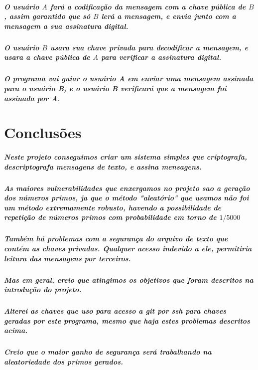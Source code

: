 \documentclass[12pt,twoside, a4paper, twocolumn]{article}
\begin{document}
\subparagraph*{O usuário $A$ fará a codificação da mensagem com a chave pública de $B$, assim garantido que só $B$ lerá a mensagem, e envia junto com a mensagem a sua assinatura digital.}

\subparagraph*{O usuário $B$ usara sua chave privada para decodificar a mensagem, e usara a chave pública de $A$ para verificar a assinatura digital.}

\subparagraph*{O programa vai guiar o usuário A em enviar uma mensagem assinada para o usuário B, e o usuário B verificará que a mensagem foi assinada por A.}

\section{Conclusões}

\subparagraph*{Neste projeto conseguimos criar um sistema simples que criptografa, descriptografa mensagens de texto, e assina mensagens.}

\subparagraph*{As maiores vulnerabilidades que enxergamos no projeto sao a geração dos números primos, ja que o método "aleatório" que usamos não foi um método extremamente robusto, havendo a possibilidade de repetição de números primos com probabilidade em torno de $1/5000$}

\subparagraph*{Também há problemas com a segurança do arquivo de texto que contém as chaves privadas. Qualquer acesso indevido a ele, permitiria leitura das mensagens por terceiros.}

\subparagraph*{Mas em geral, creio que atingimos os objetivos que foram descritos na introdução do projeto.}

\subparagraph*{Alterei as chaves que uso para acesso a git por ssh para chaves geradas por este programa, mesmo que haja estes problemas descritos acima. }

\subparagraph*{Creio que o maior ganho de segurança será trabalhando na
    aleatoriedade dos primos gerados.}
\end{document}
